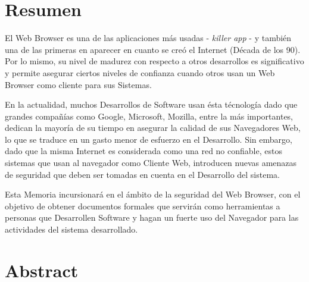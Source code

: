 
\section*{Resumen}
\label{chap:resumen}

El Web Browser es una de las aplicaciones más usadas - \textit{killer app} - y también una de las primeras en aparecer en cuanto se creó el Internet (Década de los 90). Por lo mismo, su nivel de madurez con respecto a otros desarrollos es significativo y permite asegurar ciertos niveles de confianza cuando otros usan un Web Browser como cliente para sus Sistemas. 

En la actualidad, muchos Desarrollos de Software usan ésta técnología dado que grandes compañías como Google, Microsoft, Mozilla, entre la más importantes, dedican la mayoría de su tiempo en asegurar la calidad de sus Navegadores Web, lo que se traduce en un gasto menor de esfuerzo en el Desarrollo. Sin embargo, dado que la misma Internet es considerada como una red no confiable, estos sistemas que usan al navegador como Cliente Web, introducen nuevas amenazas de seguridad que deben ser tomadas en cuenta en el Desarrollo del sistema.

Esta Memoria incursionará en el ámbito de la seguridad del Web Browser, con el objetivo de obtener documentos formales que servirán como herramientas a personas que Desarrollen Software y hagan un fuerte uso del Navegador para las actividades del sistema desarrollado.



\section*{Abstract}
\label{chap:abstract}



